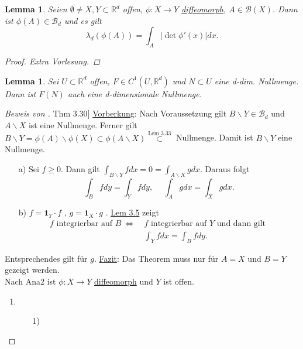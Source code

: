\documentclass[a4paper]{report}
\newcommand{\doubleOne}{\textbf{1}}
\newcommand{\R}{\mathbb{R}}
\newcommand{\Borel}{\mathcal{B}}
\newcommand{\Bd}{\Borel_d}
\newcommand{\jlabel}[1]{\label{j_#1}}
\newcommand{\jshortlink}[1]{\jhyperref{#1}{\text{#1}}}
\newcommand{\jhyperref}[2]{\hyperref[j_#1]{#2}}
\newcommand{\jlink}[1]{\jhyperref{#1}{#1}}
\newcommand{\fu}{\text{\textit{(f.ü.)}}}
\newcommand{\jabb}[3]{ #1: #2 \rightarrow #3 }
\theoremstyle{plain}
\newtheorem{lem}[thm]{Lemma}
\theoremstyle{definition}
\begin{document}
{{{{\begin{lem}
    \jlabel{Lem 3.32}
    Seien $\emptyset \ne X,Y \subset \R^d$ offen, $\jabb{\phi}{X}{Y}$ \jlink{diffeomorph}, $A\in \Borel(X)$. Dann ist $\phi(A)\in \Bd$ und es gilt
    \[
        \lambda_d(\phi(A)) = \int_A|\det \phi'(x)|dx.
    \]
    \begin{proof}
        Extra Vorlesung.
    \end{proof}
\end{lem}

\begin{lem}
    \jlabel{Lem 3.33}
    Sei $U\subset \R^d$ offen, $F\in C^1(U,\R^d)$ und $N\subset U$ eine d-dim. Nullmenge. Dann ist $F(N)$ auch eine d-dimensionale Nullmenge.
\end{lem}

\begin{proof}[Beweis von \jlink{Thm 3.30}]
    \uline{Vorberkung}: Nach Voraussetzung gilt $B\backslash Y \in \Bd$ und $A\backslash X$ ist eine Nullmenge. Ferner gilt $B\backslash Y = \phi(A)\backslash \phi(X) \subset \phi(A\backslash X) \overset{\jshortlink{Lem 3.33}}{\subset}$ Nullmenge. Damit ist $B\backslash Y$ eine Nullmenge.
    \begin{itemize}
        \item[a)] Sei $f\ge 0$. Dann gilt $\int_{B\backslash Y} f dx = 0 = \int_{A\backslash X} g dx$. Daraus folgt
            \[
                \int_B f dy = \int_Y f dy, \hspace{15pt} \int_A g dx = \int_X g dx.
            \]
        \item[b)] $f = \doubleOne_Y\cdot f$ \fu, $g = \doubleOne_X\cdot g$ \fu. \jlink{Lem 3.5} zeigt
        \[
            \begin{split}
                f\text{ integrierbar auf } B \ \Leftrightarrow \ &f \text{ integrierbar auf } Y \text{ und dann gilt }\\
                                                             &\int_Y f dx = \int_B f dy.
            \end{split}
        \]
    \end{itemize}
    Entsprechendes gilt für $g$. \uline{Fazit}: Das Theorem muss nur für $A=X$ und $B=Y$ gezeigt werden.\\
    Nach Ana2 ist $\jabb{\phi}{X}{Y}$ \jlink{diffeomorph} und $Y$ ist offen.
    \begin{enumerate}
        \item 
            \begin{itemize}
                \item[1)] 

\end{itemize}
\end{enumerate}
\end{proof}}}}}
\end{document}
